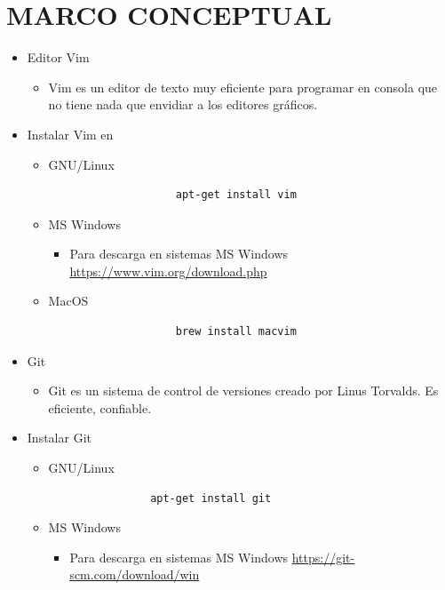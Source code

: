 \documentclass{article}
\begin{document}
	\section{MARCO CONCEPTUAL}
	\begin{itemize}
		\item Editor Vim
        \begin{itemize}
            \item Vim es un editor de texto muy eficiente para programar en consola que no tiene nada que envidiar a los editores gráficos.
        \end{itemize}
        \item Instalar Vim en
        \begin{itemize}
            \item GNU/Linux
                \begin{lstlisting}
                    apt-get install vim
                \end{lstlisting}
            \item MS Windows
            \begin{itemize}
                \item Para descarga en sistemas MS Windows \url{https://www.vim.org/download.php}
            \end{itemize}
            \item MacOS
                \begin{lstlisting}
                    brew install macvim
                \end{lstlisting}
        \end{itemize}
        \item Git
        \begin{itemize}
            \item Git es un sistema de control de versiones creado por Linus Torvalds. Es eficiente, confiable.
        \end{itemize}
        \item Instalar Git
        \begin{itemize}
            \item GNU/Linux
                \begin{lstlisting}
                apt-get install git    
                \end{lstlisting}
            \item MS Windows
            \begin{itemize}
                \item Para descarga en sistemas MS Windows \url{https://git-scm.com/download/win}

\end{itemize}
\end{itemize}
\end{itemize}
\end{document}
